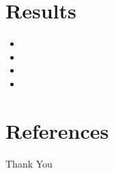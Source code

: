 \documentclass[serif, aspectratio=169]{beamer}
\begin{document}
\section{Results}
\begin{frame}
    \begin{itemize}
        \item \lipsum[4][1-4]
        \item \lipsum[4][5-9]
        \item \lipsum[5][1-4]
        \item \lipsum[5][5-8]
    \end{itemize}
\end{frame}

\section{References}

\begin{frame}[allowframebreaks]
    
    
    \nocite{*} %
\end{frame}


\begin{frame}
    \begin{center}
        {\Huge\calligra Thank You}
    \end{center}
\end{frame}
\end{document}
